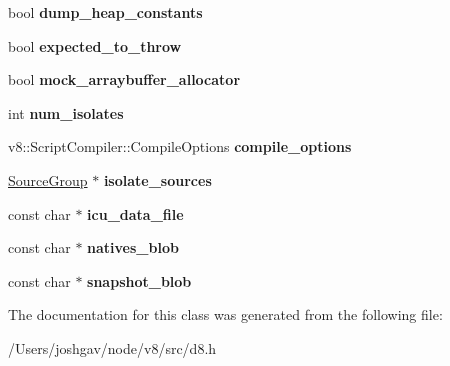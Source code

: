 \begin{DoxyCompactItemize}
\item 
bool {\bfseries dump\+\_\+heap\+\_\+constants}\hypertarget{classv8_1_1_shell_options_ac3dd45a743f8eb417e45dadc43fcddb3}{}\label{classv8_1_1_shell_options_ac3dd45a743f8eb417e45dadc43fcddb3}

\item 
bool {\bfseries expected\+\_\+to\+\_\+throw}\hypertarget{classv8_1_1_shell_options_ae85fcfe7caddc5dca5d2b15bef3d120a}{}\label{classv8_1_1_shell_options_ae85fcfe7caddc5dca5d2b15bef3d120a}

\item 
bool {\bfseries mock\+\_\+arraybuffer\+\_\+allocator}\hypertarget{classv8_1_1_shell_options_a1a3438baa8bc8603c04ee0e4340a5c98}{}\label{classv8_1_1_shell_options_a1a3438baa8bc8603c04ee0e4340a5c98}

\item 
int {\bfseries num\+\_\+isolates}\hypertarget{classv8_1_1_shell_options_ae54d644c9cf130de4621fc7da0238811}{}\label{classv8_1_1_shell_options_ae54d644c9cf130de4621fc7da0238811}

\item 
v8\+::\+Script\+Compiler\+::\+Compile\+Options {\bfseries compile\+\_\+options}\hypertarget{classv8_1_1_shell_options_a709958f798705295ed94fc1558c05833}{}\label{classv8_1_1_shell_options_a709958f798705295ed94fc1558c05833}

\item 
\hyperlink{classv8_1_1_source_group}{Source\+Group} $\ast$ {\bfseries isolate\+\_\+sources}\hypertarget{classv8_1_1_shell_options_a07329ee8598bf8dc66974fdd8a01f2f5}{}\label{classv8_1_1_shell_options_a07329ee8598bf8dc66974fdd8a01f2f5}

\item 
const char $\ast$ {\bfseries icu\+\_\+data\+\_\+file}\hypertarget{classv8_1_1_shell_options_a18d1f36a0620224c26d36622b1d5a5c0}{}\label{classv8_1_1_shell_options_a18d1f36a0620224c26d36622b1d5a5c0}

\item 
const char $\ast$ {\bfseries natives\+\_\+blob}\hypertarget{classv8_1_1_shell_options_a00989ecefd272d78eacc1e335582a4a5}{}\label{classv8_1_1_shell_options_a00989ecefd272d78eacc1e335582a4a5}

\item 
const char $\ast$ {\bfseries snapshot\+\_\+blob}\hypertarget{classv8_1_1_shell_options_a44f7c4c6255df6c8ff8303cf5154c622}{}\label{classv8_1_1_shell_options_a44f7c4c6255df6c8ff8303cf5154c622}

\end{DoxyCompactItemize}


The documentation for this class was generated from the following file\+:\begin{DoxyCompactItemize}
\item 
/\+Users/joshgav/node/v8/src/d8.\+h\end{DoxyCompactItemize}
